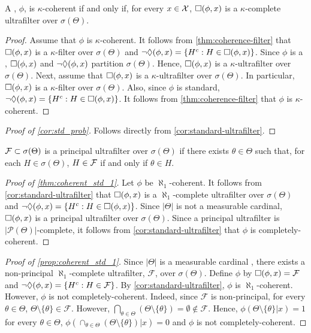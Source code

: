 \begin{lemma}
 \label{cor:standard-ultrafilter}
  A \stdsumm, $\phi$, is
  $\kappa$-coherent if and only if,
  for every $x \in \mathcal{X}$,
  $\square({\phi,x})$ is
  a $\kappa$-complete ultrafilter over $\sigma(\Theta)$.
\end{lemma}

\begin{proof}
 Assume that $\phi$ is $\kappa$-coherent.
 It follows from \cref{thm:coherence-filter} that
 $\square({\phi,x})$ is a $\kappa$-filter over $\sigma(\Theta)$ and
 $\lnot \Diamond({\phi,x}) = \{H^c: H \in \square({\phi,x})\}$.
 Since $\phi$ is a \stdsumm,
 $\square({\phi,x})$ and $\lnot \Diamond({\phi,x})$ partition $\sigma(\Theta)$.
 Hence, $\square({\phi,x})$ is a 
 $\kappa$-ultrafilter over $\sigma(\Theta)$.
 Next, assume that 
 $\square({\phi,x})$ is a $\kappa$-ultrafilter over $\sigma(\Theta)$.
 In particular, $\square({\phi,x})$ is a $\kappa$-filter over $\sigma(\Theta)$.
 Also, since $\phi$ is standard,
 $\lnot \Diamond({\phi,x}) = \{H^c: H \in \square({\phi,x})\}$.
 It follows from \cref{thm:coherence-filter} that
 $\phi$ is $\kappa$-coherent.
\end{proof}

\begin{proof}[Proof of \cref{cor:std_prob}]
 Follows directly from \cref{cor:standard-ultrafilter}.
\end{proof}

\begin{definition}
 \label{def:princ_ultrafilter}
 $\mathcal{F} \subset \sigma(\Theta)$ is a principal ultrafilter over $\sigma(\Theta)$ if there exists $\theta \in \Theta$ such that, for each $H \in \sigma(\Theta)$,
 $H \in \mathcal{F}$ if and only if $\theta \in H$.
\end{definition}

\begin{proof}[Proof of \cref{thm:coherent_std_1}]
  Let $\phi$ be $\aleph_1$-coherent. It follows from \cref{cor:standard-ultrafilter} that $\square({\phi,x})$ is a $\aleph_1$-complete ultrafilter over $\sigma(\Theta)$ and $\lnot \Diamond({\phi,x}) = \{H^c: H \in \square({\phi,x})\}$. Since $|\Theta|$ is not a measurable cardinal, $\square({\phi,x})$ is a principal ultrafilter over $\sigma(\Theta)$. Since a principal ultrafilter is $|\mathcal{P}(\Theta)|$-complete, it follows from \cref{cor:standard-ultrafilter} that $\phi$ is completely-coherent.
\end{proof}

\begin{proof}[Proof of \cref{prop:coherent_std_1}]
 Since $|\Theta|$ is a measurable cardinal \citep{Ulam1930}, there exists a non-principal $\aleph_1$-complete ultrafilter, $\mathcal{F}$, over $\sigma(\Theta)$. Define $\phi$ by $\square({\phi,x}) = \mathcal{F}$ and $\lnot \Diamond({\phi,x}) = \{H^c: H \in \mathcal{F}\}$. By \cref{cor:standard-ultrafilter}, $\phi$ is $\aleph_1$-coherent. However, $\phi$ is not completely-coherent. Indeed, since $\mathcal{F}$ is non-principal, for every $\theta \in \Theta$, $\Theta \setminus \{\theta\} \in \mathcal{F}$. However,
 $\bigcap_{\theta \in \Theta} (\Theta \setminus \{\theta\}) = \emptyset \notin \mathcal{F}$. Hence, $\phi(\Theta \setminus \{\theta\}|x) = 1$ for every $\theta \in \Theta$, $\phi(\cap_{\theta \in \Theta} (\Theta \setminus \{\theta\})|x) = 0$ and $\phi$ is not completely-coherent.
\end{proof}

